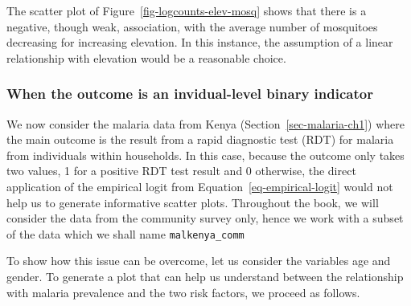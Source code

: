 \documentclass[
  letterpaper,
]{krantz}
\newenvironment{Shaded}{\begin{snugshade}}{\end{snugshade}}
\newcommand{\AttributeTok}[1]{\textcolor[rgb]{0.40,0.45,0.13}{#1}}
\newcommand{\CommentTok}[1]{\textcolor[rgb]{0.37,0.37,0.37}{#1}}
\newcommand{\ConstantTok}[1]{\textcolor[rgb]{0.56,0.35,0.01}{#1}}
\newcommand{\DecValTok}[1]{\textcolor[rgb]{0.68,0.00,0.00}{#1}}
\newcommand{\FunctionTok}[1]{\textcolor[rgb]{0.28,0.35,0.67}{#1}}
\newcommand{\NormalTok}[1]{\textcolor[rgb]{0.00,0.23,0.31}{#1}}
\newcommand{\OtherTok}[1]{\textcolor[rgb]{0.00,0.23,0.31}{#1}}
\newcommand{\SpecialCharTok}[1]{\textcolor[rgb]{0.37,0.37,0.37}{#1}}
\newcommand{\StringTok}[1]{\textcolor[rgb]{0.13,0.47,0.30}{#1}}
\begin{document}
The scatter plot of Figure~\ref{fig-logcounts-elev-mosq} shows that
there is a negative, though weak, association, with the average number
of mosquitoes decreasing for increasing elevation. In this instance, the
assumption of a linear relationship with elevation would be a reasonable
choice.

\hypertarget{when-the-outcome-is-an-invidual-level-binary-indicator}{%
\subsubsection{When the outcome is an invidual-level binary
indicator}\label{when-the-outcome-is-an-invidual-level-binary-indicator}}

We now consider the malaria data from Kenya
(Section~\ref{sec-malaria-ch1}) where the main outcome is the result
from a rapid diagnostic test (RDT) for malaria from individuals within
households. In this case, because the outcome only takes two values, 1
for a positive RDT test result and 0 otherwise, the direct application
of the empirical logit from Equation~\ref{eq-empirical-logit} would not
help us to generate informative scatter plots. Throughout the book, we
will consider the data from the community survey only, hence we work
with a subset of the data which we shall name \texttt{malkenya\_comm}

\begin{Shaded}
\end{Shaded}

To show how this issue can be overcome, let us consider the variables
age and gender. To generate a plot that can help us understand between
the relationship with malaria prevalence and the two risk factors, we
proceed as follows.

\begin{Shaded}
\end{Shaded}
\end{document}
